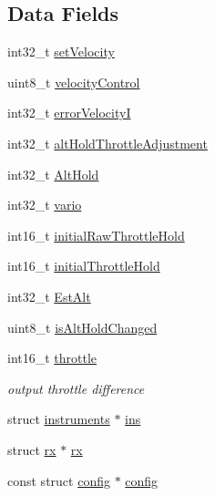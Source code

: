 \subsection*{Data Fields}
\begin{DoxyCompactItemize}
\item 
int32\+\_\+t \hyperlink{structalthold_a10ddd587dcab30fc55efac4260b39097}{set\+Velocity}
\item 
uint8\+\_\+t \hyperlink{structalthold_a265f9d24449ff559d1c771e7dc1ae59f}{velocity\+Control}
\item 
int32\+\_\+t \hyperlink{structalthold_af3993b0fd3f98a3b5ba619e5dcbd3d1a}{error\+Velocity\+I}
\item 
int32\+\_\+t \hyperlink{structalthold_af70ae8bfb496aad2ca35cf4429f9cb61}{alt\+Hold\+Throttle\+Adjustment}
\item 
int32\+\_\+t \hyperlink{structalthold_a43c5ace2baa0aad42a21fdd610c1d2cb}{Alt\+Hold}
\item 
int32\+\_\+t \hyperlink{structalthold_a29ed3693e215bf937d579133ae70a982}{vario}
\item 
int16\+\_\+t \hyperlink{structalthold_a7b8b7efa48bcc2ba190cba3d97cf5e80}{initial\+Raw\+Throttle\+Hold}
\item 
int16\+\_\+t \hyperlink{structalthold_ab42eabde44eb55707bc3723f73627174}{initial\+Throttle\+Hold}
\item 
int32\+\_\+t \hyperlink{structalthold_a96ce63b1527c61dd7f4d92319fb5777c}{Est\+Alt}
\item 
uint8\+\_\+t \hyperlink{structalthold_ae9f55ae018eca305691d2a9d13127e91}{is\+Alt\+Hold\+Changed}
\item 
int16\+\_\+t \hyperlink{structalthold_a1d7fb963289fcec2606caa41d97d1fb8}{throttle}
\begin{DoxyCompactList}\small\item\em output throttle difference \end{DoxyCompactList}\item 
struct \hyperlink{structinstruments}{instruments} $\ast$ \hyperlink{structalthold_af189ec4d1853aebf8c5c509309d1d6d6}{ins}
\item 
struct \hyperlink{structrx}{rx} $\ast$ \hyperlink{structalthold_a684ad4c706d0c8969458508376aa2ab0}{rx}
\item 
const struct \hyperlink{structconfig}{config} $\ast$ \hyperlink{structalthold_a162c43b286cb0fb6e5da3bf6cb65fc6e}{config}
\end{DoxyCompactItemize}


